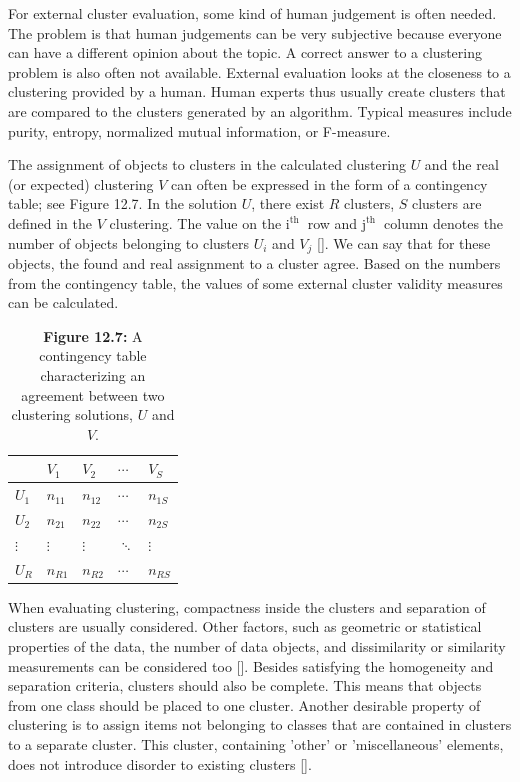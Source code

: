For external cluster evaluation, some kind of human judgement is often needed. The problem is that human judgements can be very subjective because everyone can have a different opinion about the topic. A correct answer to a clustering problem is also often not available. External evaluation looks at the closeness to a clustering provided by a human. Human experts thus usually create clusters that are compared to the clusters generated by an algorithm. Typical measures include purity, entropy, normalized mutual information, or F-measure.

The assignment of objects to clusters in the calculated clustering $U$ and the real (or expected) clustering $V$ can often be expressed in the form of a contingency table; see Figure 12.7. In the solution $U$, there exist $R$ clusters, $S$ clusters are defined in the $V$ clustering. The value on the $\mathrm{i}^{\text {th }}$ row and $\mathrm{j}^{\text {th }}$ column denotes the number of objects belonging to clusters $U_{i}$ and $V_{j}$ [\cite{ref267}]. We can say that for these objects, the found and real assignment to a cluster agree. Based on the numbers from the contingency table, the values of some external cluster validity measures can be calculated.

\begin{table}[h]
\begin{center}
\begin{tabular}{l|llll}
 & $V_{1}$ & $V_{2}$ & $\cdots$ & $V_{S}$ \\
\hline
$U_{1}$ & $n_{11}$ & $n_{12}$ & $\cdots$ & $n_{1 S}$ \\
$U_{2}$ & $n_{21}$ & $n_{22}$ & $\cdots$ & $n_{2 S}$ \\
$\vdots$ & $\vdots$ & $\vdots$ & $\ddots$ & $\vdots$ \\
$U_{R}$ & $n_{R 1}$ & $n_{R 2}$ & $\cdots$ & $n_{R S}$ \\
\end{tabular}
\captionsetup{labelformat=empty}
\caption{\textbf{Figure 12.7:} A contingency table characterizing an agreement between two clustering solutions, $U$ and $V$.}
\end{center}
\end{table}

When evaluating clustering, compactness inside the clusters and separation of clusters are usually considered. Other factors, such as geometric or statistical properties of the data, the number of data objects, and dissimilarity or similarity measurements can be considered too [\cite{ref45}]. Besides satisfying the homogeneity and separation criteria, clusters should also be complete. This means that objects from one class should be placed to one cluster. Another desirable property of clustering is to assign items not belonging to classes that are contained in clusters to a separate cluster. This cluster, containing 'other' or 'miscellaneous' elements, does not introduce disorder to existing clusters [\cite{ref13}].


